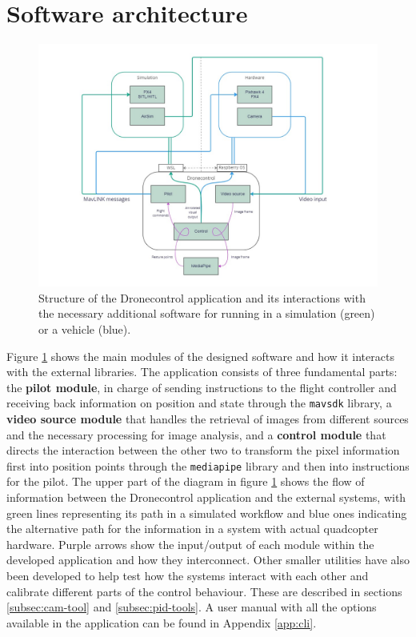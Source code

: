 \section{Software architecture}

\begin{figure}
  \centering
  \includegraphics[width=\textwidth, keepaspectratio]{img/software-arch.jpg}
  \caption{Structure of the Dronecontrol application and its interactions with the necessary additional software for running in a simulation (green) or a vehicle (blue).}
\label{fig:architecture}
\end{figure}


Figure \ref{fig:architecture} shows the main modules of the designed software and how it interacts with the external libraries.
The application consists of three fundamental parts: the \textbf{pilot module}, in charge of sending instructions to the flight controller and receiving back information on position and state through the \texttt{mavsdk} library, 
a \textbf{video source module} that handles the retrieval of images from different sources and the necessary processing for image analysis,
and a \textbf{control module} that directs the interaction between the other two to transform the pixel information first into position points through the \texttt{mediapipe} library and then into instructions for the pilot.
The upper part of the diagram in figure \ref{fig:architecture} shows the flow of information between the Dronecontrol application and the external systems, with green lines representing its path in a simulated workflow and blue ones indicating the alternative path for the information in a system with actual quadcopter hardware.
Purple arrows show the input/output of each module within the developed application and how they interconnect.
Other smaller utilities have also been developed to help test how the systems interact with each other and calibrate different parts of the control behaviour.
These are described in sections \ref{subsec:cam-tool} and \ref{subsec:pid-tools}.
A user manual with all the options available in the application can be found in Appendix \ref{app:cli}.

